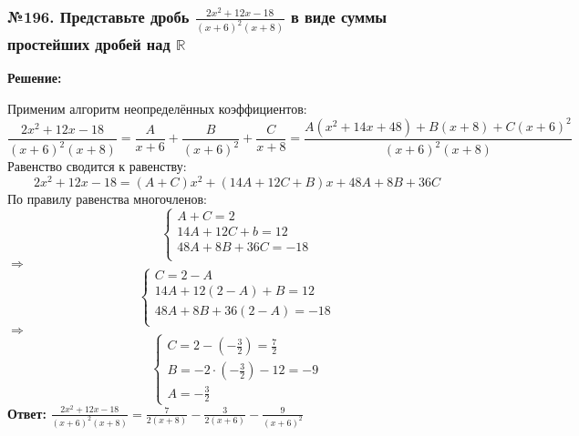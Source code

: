 \documentclass[a4paper]{article}
\begin{document}
\subsubsection*{№196. Представьте дробь $\frac{2x^2+12x-18}{(x+6)^2(x+8)}$ в виде суммы простейших дробей над $\mathbb{R}$}
\textbf{Решение:} \par 
Применим алгоритм неопределённых коэффициентов:
\[\frac{2x^2+12x-18}{(x+6)^2(x+8)}=\frac{A}{x+6}+\frac{B}{(x+6)^2}+\frac{C}{x+8}=\frac{A(x^2+14x+48)+B(x+8)+C(x+6)^2}{(x+6)^2(x+8)}\]
Равенство сводится к равенству:
\[2x^2+12x-18=(A+C)x^2+(14A+12C+B)x+48A+8B+36C\]
По правилу равенства многочленов:
\begin{equation*}
 \begin{cases}
	A+C=2 \\
	14A+12C+b=12 \\
	48A+8B+36C=-18 \\
 \end{cases}
\end{equation*}
$\Rightarrow$
\begin{equation*}
 \begin{cases}
	C=2-A \\
	14A+12(2-A)+B=12 \\
	48A+8B+36(2-A)=-18 \\
 \end{cases}
\end{equation*}
$\Rightarrow$
\begin{equation*}
 \begin{cases}
	C=2-(-\frac{3}{2})=\frac{7}{2} \\
	B=-2\cdot(-\frac{3}{2})-12=-9 \\
	A=-\frac{3}{2}
 \end{cases}
\end{equation*}
\textbf{Ответ:} $\frac{2x^2+12x-18}{(x+6)^2(x+8)}=\frac{7}{2(x+8)}-\frac{3}{2(x+6)}-\frac{9}{(x+6)^2}$

\end{document}
